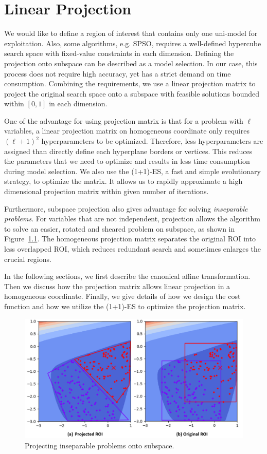 \chapter{Linear Projection}
\label{chapter:projection} 

We would like to define a region of interest that contains only one uni-model for exploitation.
Also, some algorithms, e.g. SPSO, requires a well-defined hypercube search space with fixed-value constraints in each dimension.
Defining the projection onto subspace can be described as a model selection.
In our case, this process does not require high accuracy, yet has a strict demand on time consumption.
Combining the requirements, we use a linear projection matrix to project the original search space 
onto a subspace with feasible solutions bounded within $[0,1]$ in each dimension.

One of the advantage for using projection matrix is that for a problem with $\ell$ variables, 
a linear projection matrix on homogeneous coordinate only requires $(\ell+1)^2$ hyperparameters to be optimized.
Therefore, less hyperparameters are assigned than directly define each hyperplane borders or vertices.  
This reduces the parameters that we need to optimize and results in less time consumption during model selection.
We also use the (1+1)-ES, a fast and simple evolutionary strategy, to optimize the matrix.
It allows us to rapidly approximate a high dimensional projection matrix within given number of iterations.

Furthermore, subspace projection also gives advantage for solving \textit{inseparable problems}.
For variables that are not independent, projection allows the algorithm
to solve an easier, rotated and sheared problem on subspace, as shown in Figure~\ref{fig:Projected_ROI}.
The homogeneous projection matrix separates the original ROI into less overlapped ROI, 
which reduces redundant search and sometimes enlarges the crucial regions.

In the following sections, we first describe the canonical affine transformation.
Then we discuss how the projection matrix allows linear projection in a homogeneous coordinate.
Finally, we give details of how we design the cost function and how we utilize the (1+1)-ES to optimize the projection matrix.

\begin{figure}
\centering
\includegraphics[width=\textwidth]{Projected_ROI}
\caption{Projecting inseparable problems onto subspace.}\label{fig:Projected_ROI}
\end{figure}


